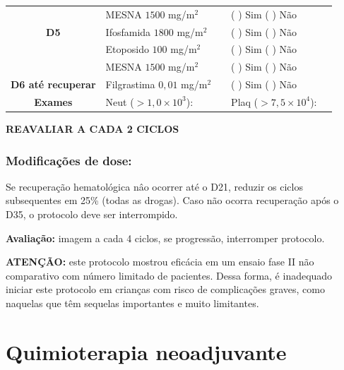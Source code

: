 \documentclass[11pt,a4paper,oldfontcommands]{memoir}
\begin{document}
\begin{center}
\begin{table}[H]
\begin{tabular}{c|p{4cm}|p{1.3cm}|p{3cm}|p{2.7cm}}
    \multicolumn{1}{c|}{\multirow{1}{*}{\textbf{}}}&{MESNA \(1500\) mg/m\(^2\)}&&{(  ) Sim (  ) Não}&\\
    \multicolumn{1}{c|}{\multirow{1}{*}{\textbf{D5}}}&{Ifosfamida \(1800\) mg/m\(^2\)}&&{(  ) Sim (  ) Não}&\\
    \multicolumn{1}{c|}{\multirow{1}{*}{\textbf{}}}&{Etoposido \(100\) mg/m\(^2\)}&&{(  ) Sim (  ) Não}&\\
    \multicolumn{1}{c|}{\multirow{1}{*}{\textbf{}}}&{MESNA \(1500\) mg/m\(^2\)}&&{(  ) Sim (  ) Não}&\\
    \multicolumn{1}{c|}{\multirow{1}{*}{\textbf{D6 até recuperar}}}&{Filgrastima \(0,01\) mg/m\(^2\)}&&{(  ) Sim (  ) Não}&\\

    \hline
    \multicolumn{1}{c|}{\multirow{1}{*}{\textbf{Exames}}}&\multicolumn{2}{l|}{Neut (\(>1,0\times10^3\)):}&{Plaq (\(>7,5\times10^4\)):}&{}\\
    \hline
\end{tabular}
\end{table}
\textbf{REAVALIAR A CADA 2 CICLOS}
\end{center}


\subsection{Modificações de dose:}
Se recuperação hematológica nâo ocorrer até o D21, reduzir os ciclos subsequentes em 25\% (todas as drogas). Caso não ocorra recuperação após o D35, o protocolo deve ser interrompido.

\textbf{Avaliação:} imagem a cada 4 ciclos, se progressão, interromper protocolo.

\textbf{ATENÇÃO:} este protocolo mostrou eficácia em um ensaio fase II não comparativo com número limitado de pacientes. Dessa forma, é inadequado iniciar este protocolo em crianças com risco de complicações graves, como naquelas que têm sequelas importantes e muito limitantes.

\cleardoublepage
\chapter{Quimioterapia neoadjuvante}
\cleardoublepage
\end{document}
